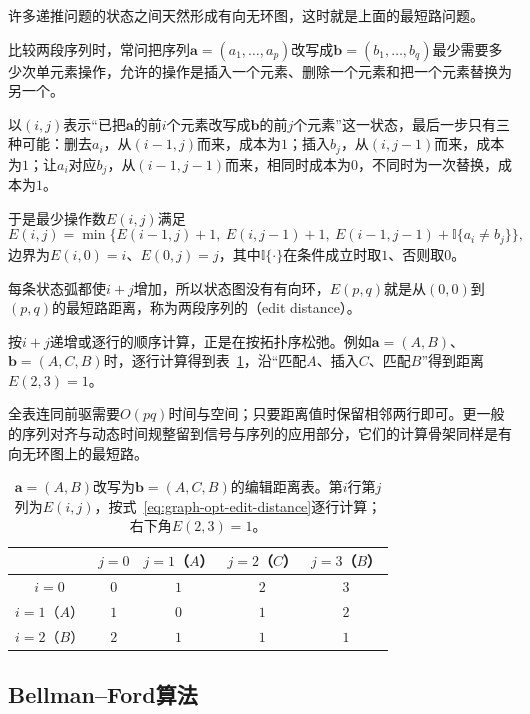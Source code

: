 许多递推问题的状态之间天然形成有向无环图，这时就是上面的最短路问题。

比较两段序列时，常问把序列$\bm a=(a_1,\ldots,a_p)$改写成$\bm b=(b_1,\ldots,b_q)$最少需要多少次单元素操作，允许的操作是插入一个元素、删除一个元素和把一个元素替换为另一个。

以$(i,j)$表示“已把$\bm a$的前$i$个元素改写成$\bm b$的前$j$个元素”这一状态，最后一步只有三种可能：删去$a_i$，从$(i-1,j)$而来，成本为$1$；插入$b_j$，从$(i,j-1)$而来，成本为$1$；让$a_i$对应$b_j$，从$(i-1,j-1)$而来，相同时成本为$0$，不同时为一次替换，成本为$1$。

于是最少操作数$E(i,j)$满足
\begin{equation}
  E(i,j)=\min\bigl\{E(i-1,j)+1,\ E(i,j-1)+1,\ E(i-1,j-1)+\mathbb I\{a_i\neq b_j\}\bigr\},
  \label{eq:graph-opt-edit-distance}
\end{equation}
边界为$E(i,0)=i$、$E(0,j)=j$，其中$\mathbb I\{\cdot\}$在条件成立时取$1$、否则取$0$。

每条状态弧都使$i+j$增加，所以状态图没有有向环，$E(p,q)$就是从$(0,0)$到$(p,q)$的最短路距离，称为两段序列的（edit distance）。

按$i+j$递增或逐行的顺序计算，正是在按拓扑序松弛。例如$\bm a=(A,B)$、$\bm b=(A,C,B)$时，逐行计算得到表~\ref{tab:graph-opt-edit-distance}，沿“匹配$A$、插入$C$、匹配$B$”得到距离$E(2,3)=1$。

全表连同前驱需要$O(pq)$时间与空间；只要距离值时保留相邻两行即可。更一般的序列对齐与动态时间规整留到信号与序列的应用部分，它们的计算骨架同样是有向无环图上的最短路。

\begin{table}[!htb]
  \centering
  \caption{$\bm a=(A,B)$改写为$\bm b=(A,C,B)$的编辑距离表。第$i$行第$j$列为$E(i,j)$，按式~\eqref{eq:graph-opt-edit-distance}逐行计算；右下角$E(2,3)=1$。}
  \label{tab:graph-opt-edit-distance}
  \begin{tabular}{@{}ccccc@{}}
    \toprule
    & $j=0$ & $j=1$（$A$） & $j=2$（$C$） & $j=3$（$B$） \\
    \midrule
    $i=0$ & $0$ & $1$ & $2$ & $3$ \\
    $i=1$（$A$） & $1$ & $0$ & $1$ & $2$ \\
    $i=2$（$B$） & $2$ & $1$ & $1$ & $1$ \\
    \bottomrule
  \end{tabular}
\end{table}

\subsection{Bellman--Ford算法}
\label{sec:graph-opt-bellman-ford}

